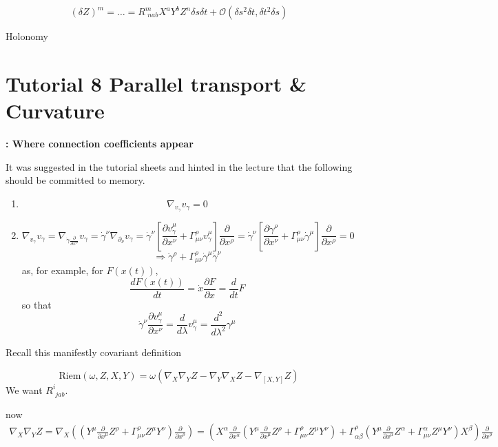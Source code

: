 \[
(\delta Z)^m = \dots = R^m_{\, \, nab} X^a Y^b Z^n \delta s \delta t + \mathcal{O}(\delta s^2 \delta t, \delta t^2 \delta s)
\]

Holonomy
	
	\section*{Tutorial 8 Parallel transport \& Curvature}
	
	
	\textbf{: Where connection coefficients appear}
	
	It was suggested in the tutorial sheets and hinted in the lecture that the following should be committed to memory.
	
	\begin{enumerate}
		\item[(a)] \[
		\nabla_{v_{\gamma}} v_{\gamma} = 0 
		\]
		\item[(b)]
		\[
		\nabla_{v_{\gamma}} v_{\gamma} = \nabla_{ \dot{\gamma} \frac{ \partial }{ \partial x^{\mu}} } v_{\gamma} = \dot{\gamma}^{\nu} \nabla_{ \partial_{\nu}} v_{\gamma} = \dot{\gamma}^{\nu} \left[ \frac{ \partial v^{\mu}_{\gamma}}{ \partial x^{\nu} } + \Gamma^{\rho}_{\mu \nu} v_{\gamma}^{\mu} \right] \frac{ \partial }{ \partial x^{\rho }} = \dot{\gamma}^{\nu} \left[ \frac{ \partial \dot{\gamma}^{\rho }}{ \partial x^{\nu}} + \Gamma^{\rho}_{\mu \nu} \dot{\gamma}^{\mu} \right] \frac{ \partial }{ \partial x^{\rho }} = 0
		\]
		\[
		\Longrightarrow \boxed{ \ddot{\gamma}^{\rho} + \Gamma^{\rho}_{\mu \nu} \dot{\gamma}^{\mu} \dot{\gamma}^{\nu} }
		\]
		as, for example, for $F(x(t))$, 
		\[
		\frac{dF(x(t))}{dt} = \dot{x} \frac{ \partial F}{ \partial x} = \frac{d}{dt} F
		\]
		so that 
		\[
		\dot{\gamma}^{\nu} \frac{ \partial v_{\gamma}^{\mu} }{ \partial x^{\nu}} = \frac{d}{d\lambda} v_{\gamma}^{\mu} = \frac{d^2}{d\lambda^2} \gamma^{\mu}
		\]
	\end{enumerate}
	
	
	Recall this manifestly covariant definition
	
	\[
	\text{Riem}(\omega, Z,X,Y) = \omega ( \nabla_X \nabla_Y Z - \nabla_Y \nabla_X Z - \nabla_{[X,Y]}Z )
	\]
	We want $R^i_{ \, \, jab}$.  
	
	now
	\[
	\begin{gathered}
	\nabla_X \nabla_Y Z = \nabla_X ( ( Y^{\mu} \frac{ \partial }{ \partial x^{\mu }} Z^{\rho} + \Gamma^{\rho}_{\mu \nu } Z^{\mu} Y^{\nu} ) \frac{\partial}{ \partial x^{\rho}} ) = (X^{\alpha} \frac{ \partial }{ \partial x^{\alpha}} (Y^{\mu} \frac{ \partial }{ \partial x^{\mu}} Z^{\rho} + \Gamma^{\rho}_{ \mu \nu} Z^{\mu} Y^{\nu}  ) + \Gamma^{\rho}_{\alpha \beta} (Y^{\mu} \frac{ \partial }{ \partial x^{\mu} } Z^{\alpha} + \Gamma^{\alpha}_{\mu \nu} Z^{\mu} Y^{\nu} ) X^{\beta} )\frac{\partial }{ \partial x^{\rho }}
	\end{gathered}
	\]
	
